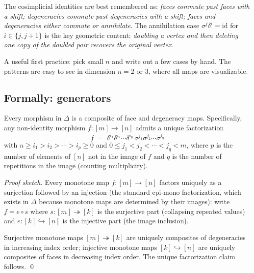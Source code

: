 \begin{readernote}
The cosimplicial identities are best remembered as: \emph{faces commute
past faces with a shift; degeneracies commute past degeneracies with a
shift; faces and degeneracies either commute or annihilate}. The
annihilation case $\sigma^j \delta^i = \mathrm{id}$ for $i \in \{j, j+1\}$
is the key geometric content: \emph{doubling a vertex and then deleting
one copy of the doubled pair recovers the original vertex}.

A useful first practice: pick small $n$ and write out a few cases by
hand. The patterns are easy to see in dimension $n = 2$ or $3$, where
all maps are visualizable.
\end{readernote}

\subsection{Formally: generators}

\begin{theorem}
\label{thm:delta-generators}
Every morphism in $\Delta$ is a composite of face and degeneracy maps.
Specifically, any non-identity morphism $f : [m] \to [n]$ admits a unique
factorization
\begin{equation*}
  f \;=\; \delta^{i_1} \delta^{i_2} \cdots \delta^{i_p} \, \sigma^{j_1} \sigma^{j_2} \cdots \sigma^{j_q}
\end{equation*}
with $n \geq i_1 > i_2 > \cdots > i_p \geq 0$ and $0 \leq j_1 < j_2 < \cdots
< j_q < m$, where $p$ is the number of elements of $[n]$ not in the image
of $f$ and $q$ is the number of repetitions in the image (counting
multiplicity).
\end{theorem}

\begin{proof}[Proof sketch]
Every monotone map $f : [m] \to [n]$ factors uniquely as a surjection
followed by an injection (the standard epi-mono factorization, which
exists in $\Delta$ because monotone maps are determined by their images):
write $f = e \circ s$ where $s : [m] \twoheadrightarrow [k]$ is the
surjective part (collapsing repeated values) and $e : [k] \hookrightarrow
[n]$ is the injective part (the image inclusion).

Surjective monotone maps $[m] \twoheadrightarrow [k]$ are uniquely
composites of degeneracies in increasing index order; injective monotone
maps $[k] \hookrightarrow [n]$ are uniquely composites of faces in
decreasing index order. The unique factorization claim follows.
\qed
\end{proof}


